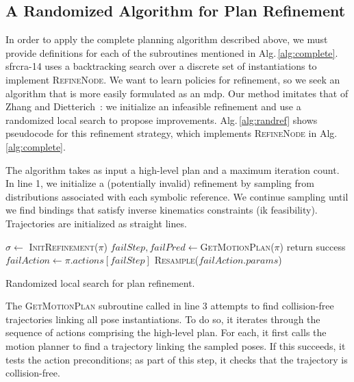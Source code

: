 \subsection{A Randomized Algorithm for Plan Refinement}
In order to apply the complete planning algorithm described above, we
must provide definitions for each of the subroutines mentioned in
Alg.\,\ref{alg:complete}. {\sc sfrcra-14} uses a backtracking search
over a discrete set of instantiations to implement
\textsc{RefineNode}. We want to learn policies for refinement, so we
seek an algorithm that is more easily formulated as an {\sc mdp}. Our
method imitates that of Zhang and Dietterich~\cite{JobShopSched}: we
initialize an infeasible refinement and use a randomized local search
to propose improvements. Alg.\,\ref{alg:randref} shows pseudocode for
this refinement strategy, which implements \textsc{RefineNode} in
Alg.\,\ref{alg:complete}.

The algorithm takes as input a high-level plan and a maximum iteration
count.  In line 1, we initialize a (potentially invalid) refinement by
sampling from distributions associated with each symbolic
reference. We continue sampling until we find bindings that satisfy
inverse kinematics constraints ({\sc ik} feasibility). Trajectories
are initialized as straight lines.

\begin{algorithm}[t]
\begin{small}
  \SetAlgoLined
  \DontPrintSemicolon
   {
  \nl $\sigma \leftarrow$ \textsc{InitRefinement}($\pi$)\;
  \nl {} {
  \nl $failStep, failPred \leftarrow $\textsc{GetMotionPlan}($\pi$)\;
  \nl {} {
  \nl return success }
  \nl {} {
  \nl $failAction \leftarrow \pi.actions[failStep]$\;
  \nl \textsc{Resample}($failAction.params$) }
  \nl {} }}

\end{small}
\caption{Randomized local search for plan refinement.}
\label{alg:randref}
\end{algorithm}

The \textsc{GetMotionPlan} subroutine called in line 3 attempts to
find collision-free trajectories linking all pose instantiations.
To do so, it iterates through the sequence of actions comprising the high-level plan.
For each, it first calls the motion planner to find a trajectory
linking the sampled poses. If this succeeds, it tests the action preconditions;
as part of this step, it checks that the trajectory is collision-free.

